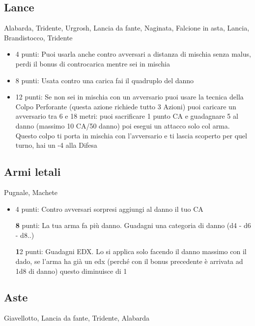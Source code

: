 \documentclass[a4paper,11pt,twoside,openany]{book}
\begin{document}
\subsection{Lance} Alabarda, Tridente, Urgrosh, Lancia da fante, Naginata, Falcione in asta, Lancia, Brandistocco, Tridente

\begin{itemize}
	\item 4 punti: Puoi usarla anche contro avversari a distanza di mischia senza malus, perdi il bonus di controcarica mentre sei in mischia

	\item 8 punti: Usata contro una carica fai il quadruplo del danno

	\item 12 punti: Se non sei in mischia con un avversario puoi usare la tecnica della Colpo Perforante (questa azione richiede tutto 3 Azioni) puoi caricare un avversario tra 6 e 18 metri: puoi sacrificare 1 punto CA e guadagnare 5 al danno (massimo 10 CA/50 danno) poi esegui un attacco solo col arma. Questo colpo ti porta in mischia con l'avversario e ti lascia scoperto per quel turno, hai un -4 alla Difesa

\end{itemize}

\subsection{Armi letali} Pugnale, Machete

\begin{itemize}

	\item 4 punti: Contro avversari sorpresi aggiungi al danno il tuo CA

	      \textbf 8 punti: La tua arma fa più danno. Guadagni una categoria di danno (d4 - d6 - d8..)

	      \textbf 12 punti: Guadagni EDX. Lo si applica solo facendo il danno massimo con il dado, se l'arma ha già un edx (perché con il bonus precedente è arrivata ad 1d8 di danno) questo diminuisce di 1

\end{itemize}

\subsection{Aste} Giavellotto, Lancia da fante, Tridente, Alabarda
\end{document}

